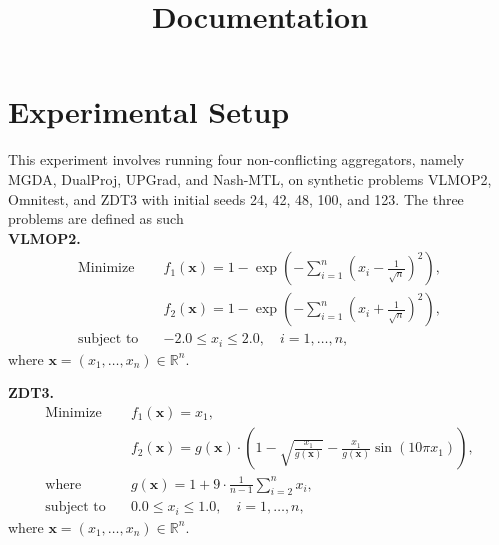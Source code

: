 \documentclass{article}
\title{Documentation}
\renewcommand{\|}{\biggr|}
\begin{document}
\maketitle
    \section{Experimental Setup}
    This experiment involves running four non-conflicting aggregators, namely MGDA, DualProj, UPGrad, and Nash-MTL, on synthetic problems VLMOP2, Omnitest, and ZDT3 with initial seeds 24, 42, 48, 100, and 123. The three problems are defined as such\\
    \textbf{VLMOP2.} 
    \begin{align*}
    \text{Minimize} \quad & f_1(\mathbf{x}) = 1 - \exp\left(-\sum_{i=1}^n \left(x_i - \frac{1}{\sqrt{n}}\right)^2\right), \\
    & f_2(\mathbf{x}) = 1 - \exp\left(-\sum_{i=1}^n \left(x_i + \frac{1}{\sqrt{n}}\right)^2\right), \\
    \text{subject to} \quad & -2.0 \leq x_i \leq 2.0, \quad i = 1, \dots, n,
    \end{align*}
    where \(\mathbf{x} = (x_1, \dots, x_n) \in \mathbb{R}^n\).

    \textbf{ZDT3.} 
    \begin{align*}
    \text{Minimize} \quad & f_1(\mathbf{x}) = x_1, \\
    & f_2(\mathbf{x}) = g(\mathbf{x}) \cdot \left(1 - \sqrt{\frac{x_1}{g(\mathbf{x})}} - \frac{x_1}{g(\mathbf{x})} \sin(10\pi x_1)\right), \\
    \text{where} \quad & g(\mathbf{x}) = 1 + 9 \cdot \frac{1}{n-1} \sum_{i=2}^n x_i, \\
    \text{subject to} \quad & 0.0 \leq x_i \leq 1.0, \quad i = 1, \dots, n,
    \end{align*}
    where \(\mathbf{x} = (x_1, \dots, x_n) \in \mathbb{R}^n\).
\end{document}
